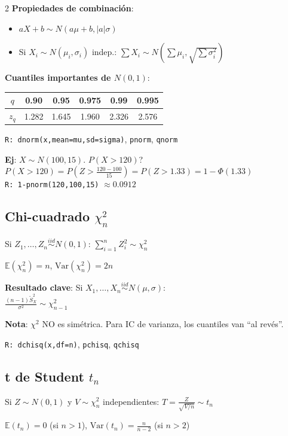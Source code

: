 \documentclass[9pt,a4paper]{article}
\newcommand{\E}{\mathbb{E}}
\newcommand{\Var}{\text{Var}}
\newcommand{\R}{\texttt{R: }}
\begin{document}
\begin{multicols}{2}
\textbf{Propiedades de combinación}:
\begin{itemize}[leftmargin=*]
\item $aX+b\sim N(a\mu+b, |a|\sigma)$
\item Si $X_i\sim N(\mu_i,\sigma_i)$ indep.: $\sum X_i\sim N(\sum\mu_i,\sqrt{\sum\sigma_i^2})$
\end{itemize}

\textbf{Cuantiles importantes de $N(0,1)$}:
\begin{center}
\begin{tabular}{c|ccccc}
$q$ & 0.90 & 0.95 & 0.975 & 0.99 & 0.995\\
\hline
$z_q$ & 1.282 & 1.645 & 1.960 & 2.326 & 2.576
\end{tabular}
\end{center}

\R\texttt{dnorm(x,mean=mu,sd=sigma)}, \texttt{pnorm}, \texttt{qnorm}

\begin{exbox}
\textbf{Ej}: $X\sim N(100,15)$. $P(X>120)$?\\
$P(X>120)=P(Z>\frac{120-100}{15})=P(Z>1.33)=1-\Phi(1.33)$\\
\R \texttt{1-pnorm(120,100,15)} $\approx 0.0912$
\end{exbox}

\subsection{Chi-cuadrado $\chi^2_n$}
Si $Z_1,\ldots,Z_n\stackrel{iid}{\sim}N(0,1)$: $\sum_{i=1}^n Z_i^2\sim\chi^2_n$
\begin{formulabox}
$\E(\chi^2_n)=n$, \quad $\Var(\chi^2_n)=2n$
\end{formulabox}

\textbf{Resultado clave}: Si $X_1,\ldots,X_n\stackrel{iid}{\sim}N(\mu,\sigma)$:\\
$\frac{(n-1)\tilde{S}^2_X}{\sigma^2}\sim\chi^2_{n-1}$

\textbf{Nota}: $\chi^2$ NO es simétrica. Para IC de varianza, los cuantiles van ``al revés''.

\R\texttt{dchisq(x,df=n)}, \texttt{pchisq}, \texttt{qchisq}

\subsection{t de Student $t_n$}
Si $Z\sim N(0,1)$ y $V\sim\chi^2_n$ independientes: $T=\frac{Z}{\sqrt{V/n}}\sim t_n$
\begin{formulabox}
$\E(t_n)=0$ (si $n>1$), \quad $\Var(t_n)=\frac{n}{n-2}$ (si $n>2$)
\end{formulabox}


\end{multicols}
\end{document}
